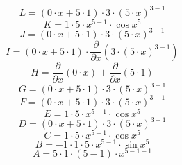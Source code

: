 \documentclass[12pt]{article}
\begin{document}
\begin{equation}
	L = 
\left( 0\cdot x + 5\cdot 1\right) \cdot 3\cdot \left( 5\cdot x\right) ^{3 - 1}
\end{equation}
\begin{equation}
	K = 
1\cdot 5\cdot x^{5 - 1}\cdot \cos {x^{5}}
\end{equation}
\begin{equation}
	J = 
\left( 0\cdot x + 5\cdot 1\right) \cdot 3\cdot \left( 5\cdot x\right) ^{3 - 1}
\end{equation}
\begin{equation}
	I = 
\left( 0\cdot x + 5\cdot 1\right) \cdot \frac{\partial}{\partial x}\left( 3\cdot \left( 5\cdot x\right) ^{3 - 1}\right) 
\end{equation}
\begin{equation}
	H = 
\frac{\partial}{\partial x}\left( 0\cdot x\right)  + \frac{\partial}{\partial x}\left( 5\cdot 1\right) 
\end{equation}
\begin{equation}
	G = 
\left( 0\cdot x + 5\cdot 1\right) \cdot 3\cdot \left( 5\cdot x\right) ^{3 - 1}
\end{equation}
\begin{equation}
	F = 
\left( 0\cdot x + 5\cdot 1\right) \cdot 3\cdot \left( 5\cdot x\right) ^{3 - 1}
\end{equation}
\begin{equation}
	E = 
1\cdot 5\cdot x^{5 - 1}\cdot \cos {x^{5}}
\end{equation}
\begin{equation}
	D = 
\left( 0\cdot x + 5\cdot 1\right) \cdot 3\cdot \left( 5\cdot x\right) ^{3 - 1}
\end{equation}
\begin{equation}
	C = 
1\cdot 5\cdot x^{5 - 1}\cdot \cos {x^{5}}
\end{equation}
\begin{equation}
	B = 
-1\cdot 1\cdot 5\cdot x^{5 - 1}\cdot \sin {x^{5}}
\end{equation}
\begin{equation}
	A = 
5\cdot 1\cdot \left( 5 - 1\right) \cdot x^{5 - 1 - 1}
\end{equation}
\end{document}
